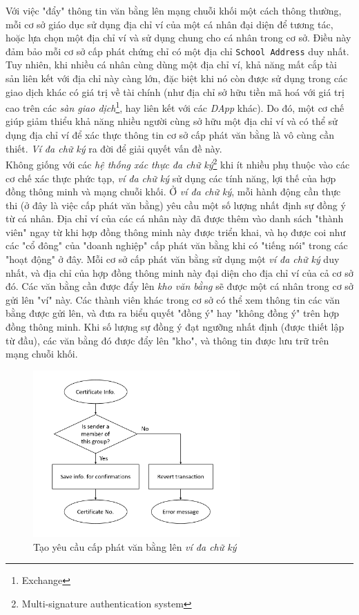 Với việc "đẩy" thông tin văn bằng lên mạng chuỗi khối một cách thông thường, mỗi cơ sở giáo dục sử dụng địa chỉ ví của một cá nhân đại diện để tương tác, hoặc lựa chọn một địa chỉ ví và sử dụng chung cho cá nhân trong cơ sở. Điều này đảm bảo mỗi cơ sở cấp phát chứng chỉ có một địa chỉ \texttt{School Address} duy nhất. Tuy nhiên, khi nhiều cá nhân cùng dùng một địa chỉ ví, khả năng mất cắp tài sản liên kết với địa chỉ này càng lớn, đặc biệt khi nó còn được sử dụng trong các giao dịch khác có giá trị về tài chính (như địa chỉ sở hữu tiền mã hoá với giá trị cao trên các \textit{sàn giao dịch}\footnote{Exchange}, hay liên kết với các \textit{DApp} khác). Do đó, một cơ chế giúp giảm thiểu khả năng nhiều người cùng sở hữu một địa chỉ ví và có thể sử dụng địa chỉ ví để xác thực thông tin cơ sở cấp phát văn bằng là vô cùng cần thiết. \textit{Ví đa chữ ký} ra đời để giải quyết vấn đề này.\\

Không giống với các \textit{hệ thống xác thực đa chữ ký}\footnote{Multi-signature authentication system} khi ít nhiều phụ thuộc vào các cơ chế xác thực phức tạp, \textit{ví đa chữ ký} sử dụng các tính năng, lợi thế của hợp đồng thông minh và mạng chuỗi khối. Ở \textit{ví đa chữ ký}, mỗi hành động cần thực thi (ở đây là việc cấp phát văn bằng) yêu cầu một số lượng nhất định sự đồng ý từ cá nhân. Địa chỉ ví của các cá nhân này đã được thêm vào danh sách "thành viên" ngay từ khi hợp đồng thông minh này được triển khai, và họ được coi như các "cổ đông" của "doanh nghiệp" cấp phát văn bằng khi có "tiếng nói" trong các "hoạt động" ở đây. Mỗi cơ sở cấp phát văn bằng sử dụng một \textit{ví đa chữ ký} duy nhất, và địa chỉ của hợp đồng thông minh này đại diện cho địa chỉ ví của cả cơ sở đó. Các văn bằng cần được đẩy lên \textit{kho văn bằng} sẽ được một cá nhân trong cơ sở gửi lên "ví" này. Các thành viên khác trong cơ sở có thể xem thông tin các văn bằng được gửi lên, và đưa ra biểu quyết "đồng ý" hay "không đồng ý" trên hợp đồng thông minh. Khi số lượng sự đồng ý đạt ngưỡng nhất định (được thiết lập từ đầu), các văn bằng đó được đẩy lên "kho", và thông tin được lưu trữ trên mạng chuỗi khối.\\

\begin{figure}[!ht]
    \centering
    \includegraphics[width=300px]{images/multisig-add-cert.png}
    \caption{Tạo yêu cầu cấp phát văn bằng lên \textit{ví đa chữ ký}}
\end{figure}

